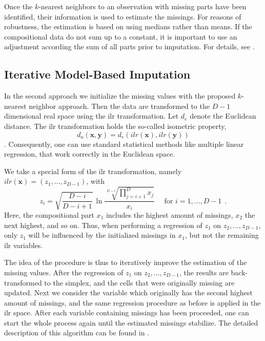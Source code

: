\documentclass{scrartcl}\usepackage[]{graphicx}\usepackage[]{color}
\newcommand{\m}[1]{\ensuremath{\mathbf{#1}}}
\begin{document}
Once the $k$-nearest neighbors to an observation with missing parts have been
identified, their information is used to estimate the missings. For reasons
of robustness, the estimation is based on using medians rather than means.
If the compositional
data do not sum up to a constant, it is important to use an adjustment according
the sum of all parts prior to imputation. For details, see \cite{Hron09}.


\subsection{Iterative Model-Based Imputation}

In the second approach we initialize the missing values with the proposed $k$-nearest 
neighbor approach. Then the data are transformed to the
$D-1$ dimensional real space using the ilr transformation.
Let $d_e$ denote the Euclidean distance. The ilr transformation holds the
so-called isometric property,
\begin{equation}
d_a(\m{x},\m{y})=d_e(ilr(\m{x}),ilr(\m{y})) 
\end{equation}
\citep{Egozcue05}. Consequently, one can use standard statistical methods 
like multiple linear regression, that work correctly in the Euclidean space.

We take a special form of the ilr transformation, namely
$ilr(\m{x})=(z_1,\dots,z_{D-1})$, with 
\begin{equation}
z_i=\sqrt{\frac{D-i}{D-i+1}}\,\ln\frac{\sqrt[D-i]{\prod_{j=i+1}^Dx_j}}{x_{i}}
\quad \mbox{ for } i=1,\ldots ,D-1 \ \ .
\end{equation}
Here, the compositional part $x_1$ includes the highest amount of missings,
$x_2$ the next highest, and so on. Thus, when performing a regression of 
$z_1$ on $z_2,\dots, z_{D-1}$, only $z_1$ will be influenced by the initialized
missings in $x_1$, but not the remaining ilr variables.

The idea of the procedure is thus to iteratively improve the estimation of the
missing values. After the regression of $z_1$ on $z_2,\dots, z_{D-1}$, the
results are back-transformed to the simplex, and the cells that were originally missing 
are updated. 
Next we consider the variable which originally has the second highest amount
of missings, and the same regression procedure as before is applied in the
ilr space. After each variable containing missings has been proceeded,
one can start the whole process again until
the estimated missings stabilize.
The detailed description of this algorithm can be found in \cite{Hron09}.
\end{document}

